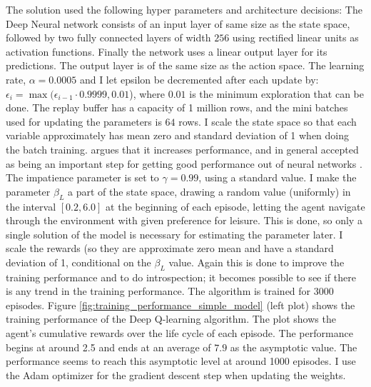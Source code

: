 The solution used the following hyper parameters and architecture decisions: The Deep Neural network consists of an input layer of same size as the state space, followed by two fully connected layers of width $256$ using rectified linear units as activation functions. Finally the network uses a linear output layer for its predictions. The output layer is of the same size as the action space. The learning rate, $\alpha=0.0005$ and I let epsilon be decremented after each update by: $\epsilon_i = \max (\epsilon_{i-1} \cdot 0.9999, 0.01$), where $0.01$ is the minimum exploration that can be done. The replay buffer has a capacity of 1 million rows, and the mini batches used for updating the parameters is $64$ rows. I scale the state space so that each variable approximately has mean zero and standard deviation of 1 when doing the batch training. \textcite{goodfellow_deep_2016} argues that it increases performance, and in general accepted as being an important step for getting good performance out of neural networks . The impatience parameter is set to $\gamma=0.99$, using a standard value. I make the parameter $\beta_L$ a part of the state space, drawing a random value (uniformly) in the interval $[0.2, 6.0]$ at the beginning of each episode, letting the agent navigate through the environment with given preference for leisure. This is done, so only a single solution of the model is necessary for estimating the parameter later. I scale the rewards (so they are approximate zero mean and have a standard deviation of 1, conditional on the $\beta_L$ value. Again this is done to improve the training performance and to do introspection; it becomes possible to see if there is any trend in the training performance. The algorithm is trained for 3000 episodes. Figure \ref{fig:training_performance_simple_model}  (left plot) shows the training performance of the Deep Q-learning algorithm. The plot shows the agent's cumulative rewards over the life cycle of each episode. The performance begins at around 2.5 and ends at an average of $7.9$ as the asymptotic value. The performance seems to reach this asymptotic level at around 1000 episodes. I use the Adam optimizer for the gradient descent step when updating the weights.

